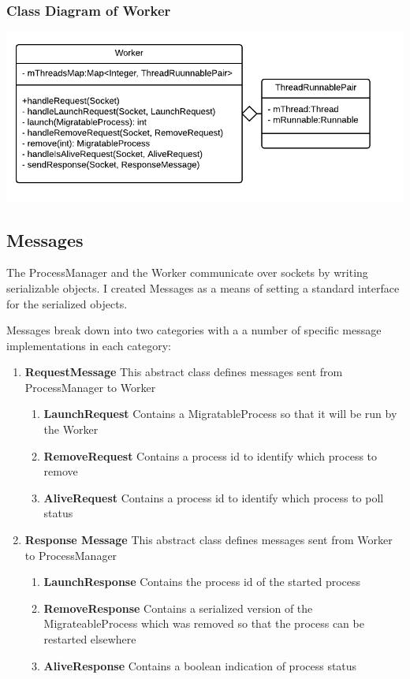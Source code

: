 \documentclass[12pt]{article}
\begin{document}
\subsubsection{Class Diagram of Worker}
\includegraphics[scale=.4]{worker.png}

\subsection{Messages}

The ProcessManager and the Worker communicate over sockets by writing serializable objects. I created Messages as a means of setting a standard interface for the serialized objects.

Messages break down into two categories with a a number of specific message implementations in each category:
\begin{enumerate}
\item \textbf{RequestMessage} This abstract class defines messages sent from ProcessManager to Worker
	\begin{enumerate}
	\item \textbf{LaunchRequest} Contains a MigratableProcess so that it will be run by the Worker
	\item \textbf{RemoveRequest} Contains a process id to identify which process to remove
	\item \textbf{AliveRequest} Contains a process id to identify which process to poll status
	\end{enumerate}
\item \textbf{Response Message} This abstract class defines messages sent from Worker to ProcessManager
	\begin{enumerate}
	\item \textbf{LaunchResponse} Contains the process id of the started process
	\item \textbf{RemoveResponse} Contains a serialized version of the MigrateableProcess which was removed so that the process can be restarted elsewhere
	\item \textbf{AliveResponse} Contains a boolean indication of process status
	\end{enumerate}
\end{enumerate}
\end{document}

